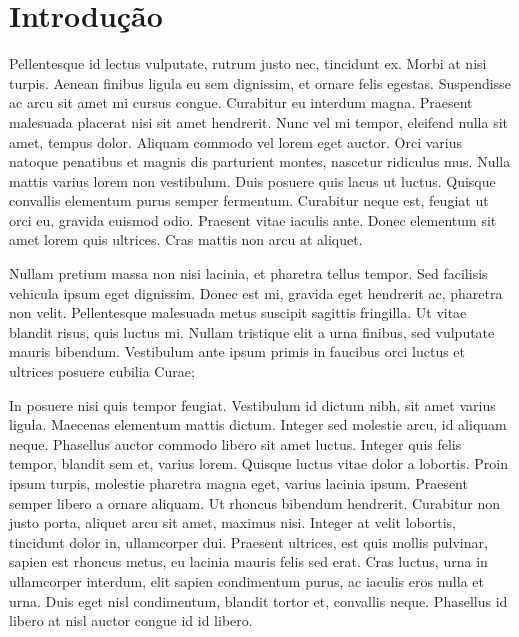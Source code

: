 \section{Introdução}


Pellentesque id lectus vulputate, rutrum justo nec, tincidunt ex. Morbi at nisi turpis. Aenean finibus ligula eu sem dignissim, et ornare felis egestas. Suspendisse ac arcu sit amet mi cursus congue. Curabitur eu interdum magna. Praesent malesuada placerat nisi sit amet hendrerit. Nunc vel mi tempor, eleifend nulla sit amet, tempus dolor. Aliquam commodo vel lorem eget auctor. Orci varius natoque penatibus et magnis dis parturient montes, nascetur ridiculus mus. Nulla mattis varius lorem non vestibulum. Duis posuere quis lacus ut luctus. Quisque convallis elementum purus semper fermentum. Curabitur neque est, feugiat ut orci eu, gravida euismod odio. Praesent vitae iaculis ante. Donec elementum sit amet lorem quis ultrices. Cras mattis non arcu at aliquet.

Nullam pretium massa non nisi lacinia, et pharetra tellus tempor. Sed facilisis vehicula ipsum eget dignissim. Donec est mi, gravida eget hendrerit ac, pharetra non velit. Pellentesque malesuada metus suscipit sagittis fringilla. Ut vitae blandit risus, quis luctus mi. Nullam tristique elit a urna finibus, sed vulputate mauris bibendum. Vestibulum ante ipsum primis in faucibus orci luctus et ultrices posuere cubilia Curae;

In posuere nisi quis tempor feugiat. Vestibulum id dictum nibh, sit amet varius ligula. Maecenas elementum mattis dictum. Integer sed molestie arcu, id aliquam neque. Phasellus auctor commodo libero sit amet luctus. Integer quis felis tempor, blandit sem et, varius lorem. Quisque luctus vitae dolor a lobortis. Proin ipsum turpis, molestie pharetra magna eget, varius lacinia ipsum. Praesent semper libero a ornare aliquam. Ut rhoncus bibendum hendrerit. Curabitur non justo porta, aliquet arcu sit amet, maximus nisi. Integer at velit lobortis, tincidunt dolor in, ullamcorper dui. Praesent ultrices, est quis mollis pulvinar, sapien est rhoncus metus, eu lacinia mauris felis sed erat. Cras luctus, urna in ullamcorper interdum, elit sapien condimentum purus, ac iaculis eros nulla et urna. Duis eget nisl condimentum, blandit tortor et, convallis neque. Phasellus id libero at nisl auctor congue id id libero. 
